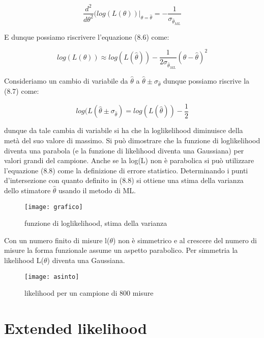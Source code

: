 \begin{equation*}
		\frac{d^2}{d\theta^2}(log(L(\theta))\vert_{\theta = \hat{\theta}} = - \frac{1}{\sigma_{\hat{\theta}_{ML}}}
\end{equation*}

\noindent E dunque possiamo riscrivere l'equazione (8.6) come:


\begin{equation}
	log(L(\theta)) \approx log(L(\hat{\theta})) -\frac{1}{2\sigma_{\hat{\theta}_{ML}}} (\theta - \hat{\theta})^2
\end{equation}

\noindent Consideriamo un cambio di variabile da $\hat{\theta}$ a $\hat{\theta}\pm \sigma_{\hat{\theta}}$ dunque possiamo riscrive la (8.7) come:

\begin{equation}
	log(L(\hat{\theta}\pm \sigma_{\hat{\theta}}) = log(L(\hat{\theta})) - \frac{1}{2}
\end{equation}

\noindent dunque da tale cambia di variabile si ha che la loglikelihood diminuisce della met\`{a} del suo valore di massimo. Si pu\`{o} dimostrare che la funzione di loglikelihood diventa una parabola (e la funzione di likelihood diventa una Gaussiana) per valori grandi del campione. Anche se la log(L) non \`{e} parabolica si pu\`{o} utilizzare l'equazione (8.8) come la definizione di errore statistico. Determinando i punti d'intersezione con quanto definito in (8.8) si ottiene una stima della varianza dello stimatore $\hat{\theta}$ usando il metodo di ML.

 
\begin{figure}[!ht]
\vspace{0.2in}
\texttt{[image: grafico]}	
\centering
\vspace{0.2in}
\caption{funzione di loglikelihood, stima della varianza}
\end{figure}

\noindent Con un numero finito di misure l($\theta$) non \`{e} simmetrico e al crescere del numero di misure la forma funzionale assume un aspetto parabolico. Per simmetria la likelihood L($\theta$) diventa una Gaussiana.

 
\begin{figure}[!ht]
\texttt{[image: asinto]}	
\centering
\caption{likelihood per un campione di 800 misure}
\end{figure}

\section{Extended likelihood}

